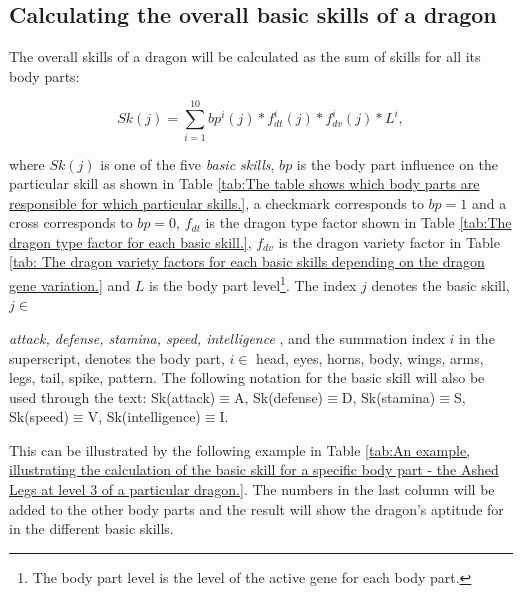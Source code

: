 \documentclass[12pt]{article}
\begin{document}
\subsection{Calculating the overall basic skills of a dragon}
\label{Calculating the overall basic skills of a dragon}  \par

The overall skills of a dragon will be calculated as the sum of skills for all its body parts:
\begin{center}
   \begin{equation}
   \label{Eq:Sk}
      Sk(j) = \sum_{i=1}^{10} bp^i(j)*f_{dt}^i(j)*f_{dv}^i(j)*L^i,
   \end{equation}
\end{center}
where  $Sk(j)$  is one of the five \textit{basic skills}, $bp$  is the body part influence on the particular skill as shown in  Table \ref{tab:The table shows which body parts are responsible for which particular skills.}, a checkmark corresponds to $bp=1$ and a cross corresponds to $bp=0$,   $f_{dt}$  is the dragon type factor shown in  Table \ref{tab:The dragon type factor for each basic skill.},  $f_{dv}$  is the dragon variety factor in  Table \ref{tab: The dragon variety factors for each basic skills depending on the dragon gene variation.} and $L$ is the body part level\footnote{The body part level is the level of the active gene for each body part.}. The index  $j$ denotes the basic skill,  $j \in$ {\textit{attack, defense, stamina, speed, intelligence} , and the summation index $i$  in the superscript, denotes the body part,  $i \in$ {head, eyes, horns, body, wings, arms, legs, tail, spike, pattern}. The following notation for the basic skill will also be used through the text: Sk(attack)$\equiv$A, Sk(defense)$\equiv$D, Sk(stamina)$\equiv$S, Sk(speed)$\equiv$V, Sk(intelligence)$\equiv$I.\par 

This can be illustrated by the following example in  Table \ref{tab:An example, illustrating the calculation of the basic skill for a specific body part - the Ashed Legs at level 3 of a particular dragon.}.  The numbers in the last column will be added to the other body parts and the result will show the dragon’s aptitude for in the different basic skills.

}
\end{document}
